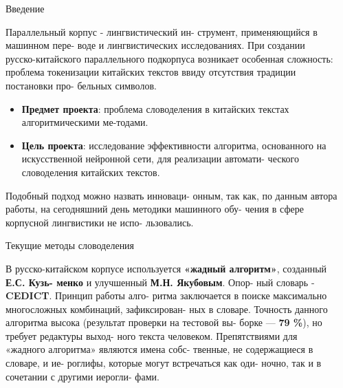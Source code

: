 \documentclass[final]{beamer}
\newlength{\sepwid}
\newlength{\onecolwid}
\begin{document}
\begin{frame}
\begin{columns}[t]
\begin{column}{\onecolwid}
\begin{exampleblock}{Введение}

Параллельный корпус - лингвистический ин- струмент, применяющийся в машинном пере- воде и лингвистических исследованиях. При создании русско-китайского параллельного подкорпуса возникает особенная сложность: проблема токенизации китайских текстов ввиду отсутствия традиции постановки про- бельных символов.
\begin{itemize}
\item \textbf{Предмет проекта}: проблема словоделения в китайских текстах алгоритмическими ме-тодами. 
\item \textbf{Цель проекта}: исследование эффективности алгоритма, основанного на искусственной нейронной сети, для реализации автомати- ческого словоделения китайских текстов.
\end{itemize}
Подобный подход можно назвать инноваци- онным, так как, по данным автора работы, на сегодняшний день методики машинного обу- чения в сфере корпусной лингвистики не испо- льзовались.

\end{exampleblock}


\begin{exampleblock}{Текущие методы словоделения}

В русско-китайском корпусе используется \textbf{«жадный алгоритм»}, созданный \textbf{Е.С. Кузь- менко} и улучшенный \textbf{М.Н. Якубовым}. Опор- ный словарь - \textbf{CEDICT}. Принцип работы алго- ритма заключается в поиске максимально многосложных комбинаций, зафиксирован- ных в словаре.
Точность данного алгоритма высока (результат проверки на тестовой вы- борке — \textbf{79 \%}), но требует редактуры выход- ного текста человеком. Препятствиями для «жадного алгоритма» являются имена собс- твенные, не содержащиеся в словаре, и ие- роглифы, которые могут встречаться как оди- ночно, так и в сочетании с другими иерогли- фами.
\end{exampleblock}


\end{column} %

\begin{column}{\sepwid}\end{column} %


\end{columns}
\end{frame}
\end{document}

